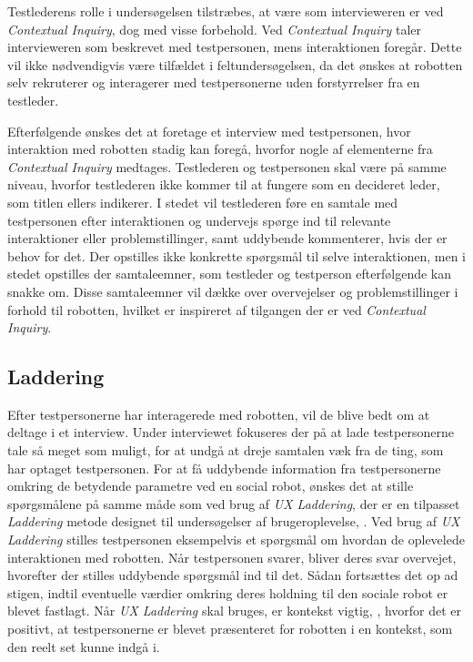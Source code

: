 Testlederens rolle i undersøgelsen tilstræbes, at være som intervieweren er ved \textit{Contextual Inquiry}, dog med visse forbehold. Ved \textit{Contextual Inquiry} taler intervieweren som beskrevet med testpersonen, mens interaktionen foregår. Dette vil ikke nødvendigvis være tilfældet i feltundersøgelsen, da det ønskes at robotten selv rekruterer og interagerer med testpersonerne uden forstyrrelser fra en testleder. 

Efterfølgende ønskes det at foretage et interview med testpersonen, hvor interaktion med robotten stadig kan foregå, hvorfor nogle af elementerne fra \textit{Contextual Inquiry} medtages. Testlederen og testpersonen skal være på samme niveau, hvorfor testlederen ikke kommer til at fungere som en decideret leder, som titlen ellers indikerer. I stedet vil testlederen føre en samtale med testpersonen efter interaktionen og undervejs spørge ind til relevante interaktioner eller problemstillinger, samt uddybende kommenterer, hvis der er behov for det. Der opstilles ikke konkrette spørgsmål til selve interaktionen, men i stedet opstilles der samtaleemner, som testleder og testperson efterfølgende kan snakke om. Disse samtaleemner vil dække over overvejelser og problemstillinger i forhold til robotten, hvilket er inspireret af tilgangen der er ved \textit{Contextual Inquiry}.
%
\subsection{Laddering}
\label{ParametreLaddering}
%
Efter testpersonerne har interagerede med robotten, vil de blive bedt om at deltage i et interview. Under interviewet fokuseres der på at lade testpersonerne tale så meget som muligt, for at undgå at dreje samtalen væk fra de ting, som har optaget testpersonen. For at få uddybende information fra testpersonerne omkring de betydende parametre ved en social robot, ønskes det at stille spørgsmålene på samme måde som ved brug af \textit{UX Laddering}, der er en tilpasset \textit{Laddering} metode designet til undersøgelser af brugeroplevelse, \parencite[ss. 3-4]{PDF:LadderingTheUserExperience}. Ved brug af \textit{UX Laddering} stilles testpersonen eksempelvis et spørgsmål om hvordan de oplevelede interaktionen med robotten. Når testpersonen svarer, bliver deres svar overvejet, hvorefter der stilles uddybende spørgsmål ind til det. Sådan fortsættes det op ad stigen, indtil eventuelle værdier omkring deres holdning til den sociale robot er blevet fastlagt. Når \textit{UX Laddering} skal bruges, er kontekst vigtig, \parencite[s. 3]{PDF:LadderingTheUserExperience}, hvorfor det er positivt, at testpersonerne er blevet præsenteret for robotten i en kontekst, som den reelt set kunne indgå i. 

